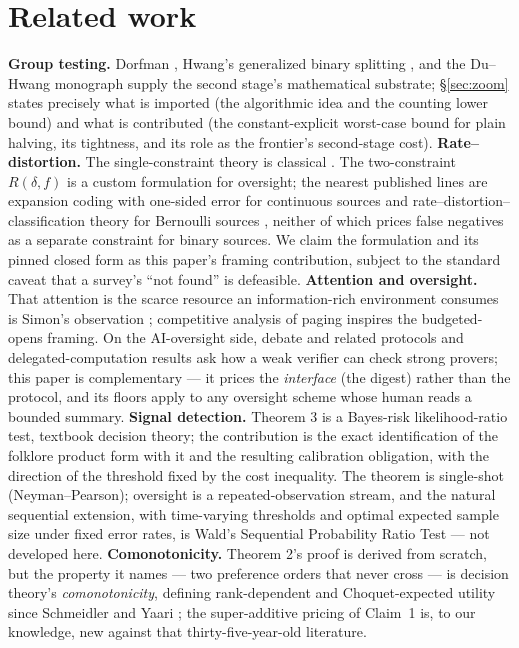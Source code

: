 \documentclass[11pt,a4paper]{article}
\begin{document}
\section{Related work}\label{sec:related}
\textbf{Group testing.} Dorfman \cite{dorfman}, Hwang's generalized binary splitting \cite{hwang}, and the Du--Hwang monograph \cite{duhwang} supply the second stage's mathematical substrate; \S\ref{sec:zoom} states precisely what is imported (the algorithmic idea and the counting lower bound) and what is contributed (the constant-explicit worst-case bound for plain halving, its tightness, and its role as the frontier's second-stage cost).
\textbf{Rate--distortion.} The single-constraint theory is classical \cite{shannon,coverthomas}. The two-constraint $R(\delta,f)$ is a custom formulation for oversight; the nearest published lines are expansion coding with one-sided error for continuous sources \cite{expansion} and rate--distortion--classification theory for Bernoulli sources \cite{rdc}, neither of which prices false negatives as a separate constraint for binary sources. We claim the formulation and its pinned closed form as this paper's framing contribution, subject to the standard caveat that a survey's ``not found'' is defeasible.
\textbf{Attention and oversight.} That attention is the scarce resource an information-rich environment consumes is Simon's observation \cite{simon}; competitive analysis of paging \cite{sleatortarjan} inspires the budgeted-opens framing. On the AI-oversight side, debate and related protocols \cite{irving} and delegated-computation results \cite{gkr} ask how a weak verifier can check strong provers; this paper is complementary --- it prices the \emph{interface} (the digest) rather than the protocol, and its floors apply to any oversight scheme whose human reads a bounded summary.
\textbf{Signal detection.} Theorem 3 is a Bayes-risk likelihood-ratio test, textbook decision theory; the contribution is the exact identification of the folklore product form with it and the resulting calibration obligation, with the direction of the threshold fixed by the cost inequality. The theorem is single-shot (Neyman--Pearson); oversight is a repeated-observation stream, and the natural sequential extension, with time-varying thresholds and optimal expected sample size under fixed error rates, is Wald's Sequential Probability Ratio Test \cite{wald1947} --- not developed here.
\textbf{Comonotonicity.} Theorem 2's proof is derived from scratch, but the property it names --- two preference orders that never cross --- is decision theory's \emph{comonotonicity}, defining rank-dependent and Choquet-expected utility since Schmeidler and Yaari \cite{schmeidler1989,yaari1987}; the super-additive pricing of Claim~1 is, to our knowledge, new against that thirty-five-year-old literature.
\end{document}

